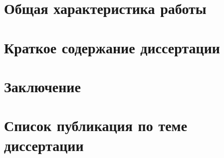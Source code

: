 \documentclass[a5paper,12pt,twoside]{article}
\begin{document}

\section*{Общая характеристика работы}

\section*{Краткое содержание диссертации}

\section*{Заключение}

\section*{Список публикация по теме диссертации}
\begin{enumerate}
  
\end{enumerate}



\end{document}
